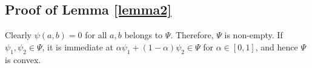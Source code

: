 \documentclass[conference,letterpaper,onecolumn]{IEEEtran}
\theoremstyle{plain}%
\newcommand{\bY}{\mathbf{Y}}
\newcommand{\by}{\mathbfit{y}}
\newcommand{\bx}{\mathbfit{x}}
\begin{document}

\subsection{Proof of Lemma \ref{lemma2}}
Clearly $\psi(a,b)=0$ for all $a,b$ belongs to $\Psi$. Therefore, $\Psi$ is non-empty. If $\psi_1,\psi_2 \in \Psi$, it is immediate at $\alpha \psi_1 + (1-\alpha)\psi_2 \in \Psi$ for $\alpha \in [0,1]$, and hence $\Psi$ is convex.
\end{document}
